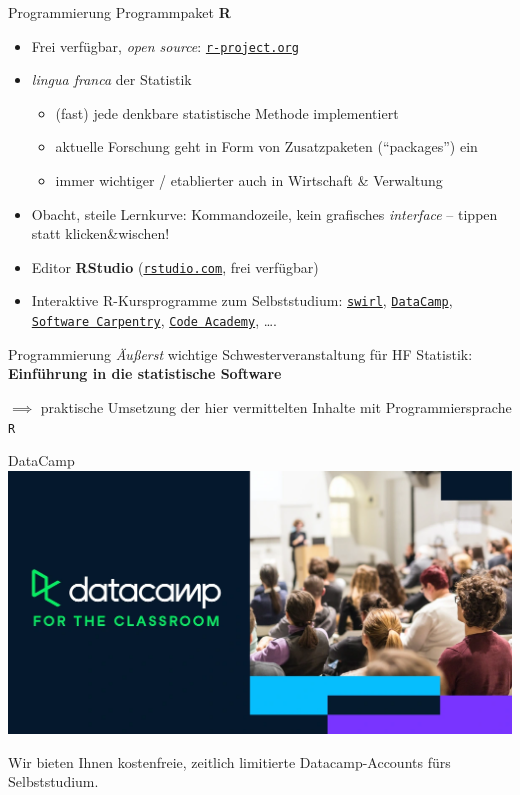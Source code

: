 \documentclass[
  10pt,
  ignorenonframetext,
]{beamer}
\providecommand{\tightlist}{%
  \setlength{\itemsep}{0pt}\setlength{\parskip}{0pt}}
\begin{document}
\begin{frame}[fragile]{Programmierung}
\label{programmierung}
Programmpaket \textbf{R}

\begin{itemize}
\item
  Frei verfügbar, \emph{open source}:
  \href{https://www.r-project.org/}{\texttt{r-project.org}}
\item
  \emph{lingua franca} der Statistik

  \begin{itemize}
  \tightlist
  \item
    (fast) jede denkbare statistische Methode implementiert
  \item
    aktuelle Forschung geht in Form von Zusatzpaketen (``packages'') ein
  \item
    immer wichtiger / etablierter auch in Wirtschaft \& Verwaltung
  \end{itemize}
\item
  Obacht, steile Lernkurve: Kommandozeile, kein grafisches
  \emph{interface} -- tippen statt klicken\&wischen!
\item
  Editor \textbf{RStudio}
  (\href{https://www.rstudio.com/}{\texttt{rstudio.com}}, frei
  verfügbar)
\item
  Interaktive R-Kursprogramme zum Selbststudium:
  \href{http://swirlstats.com/}{\texttt{swirl}},
  \href{https://learn.datacamp.com/courses?technologies=R}{\texttt{DataCamp}},
  \href{http://swcarpentry.github.io/r-novice-inflammation/}{\texttt{Software\ Carpentry}},
  \href{https://www.codecademy.com/learn/learn-r}{\texttt{Code\ Academy}},
  \ldots.
\end{itemize}
\end{frame}

\begin{frame}[fragile]{Programmierung}
\label{programmierung-1}
\emph{Äußerst} wichtige Schwesterveranstaltung für HF Statistik:\\
\textbf{Einführung in die statistische Software}

\(\implies\) praktische Umsetzung der hier vermittelten Inhalte mit
Programmiersprache \texttt{R}
\end{frame}

\begin{frame}{DataCamp}
\label{datacamp}
\includegraphics{pics/datacamp.png}

Wir bieten Ihnen kostenfreie, zeitlich limitierte Datacamp-Accounts fürs
Selbststudium.
\end{frame}
\end{document}
